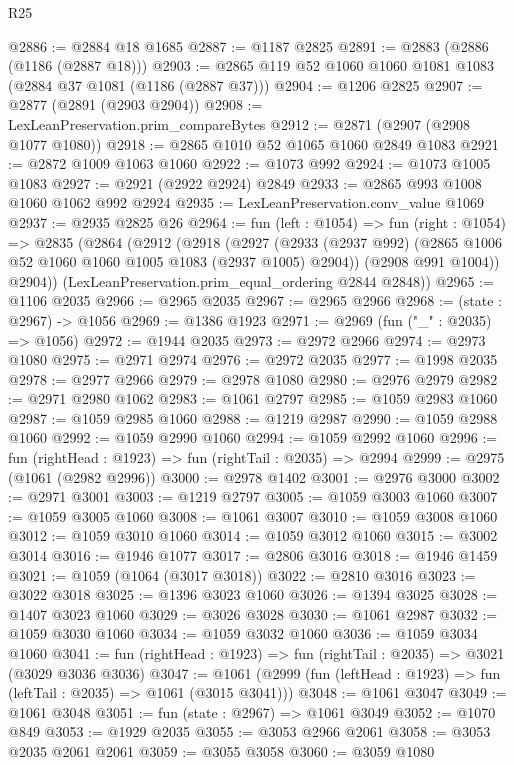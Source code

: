 \begin{lexlean}{R25}
\begin{coremodule}
@2886 := @2884 @18 @1685
@2887 := @1187 @2825
@2891 := @2883 (@2886 (@1186 (@2887 @18)))
@2903 := @2865 @119 @52 @1060 @1060 @1081 @1083 (@2884 @37 @1081 (@1186 (@2887 @37)))
@2904 := @1206 @2825
@2907 := @2877 (@2891 (@2903 @2904))
@2908 := LexLeanPreservation.prim_compareBytes
@2912 := @2871 (@2907 (@2908 @1077 @1080))
@2918 := @2865 @1010 @52 @1065 @1060 @2849 @1083
@2921 := @2872 @1009 @1063 @1060
@2922 := @1073 @992
@2924 := @1073 @1005 @1083
@2927 := @2921 (@2922 @2924) @2849
@2933 := @2865 @993 @1008 @1060 @1062 @992 @2924
@2935 := LexLeanPreservation.conv_value @1069
@2937 := @2935 @2825 @26
@2964 := fun (left : @1054) =>
  fun (right : @1054) =>
  @2835
    (@2864
      (@2912
        (@2918
          (@2927
            (@2933 (@2937 @992) (@2865 @1006 @52 @1060 @1060 @1005 @1083 (@2937 @1005) @2904))
            (@2908 @991 @1004))
          @2904))
      (LexLeanPreservation.prim_equal_ordering @2844 @2848))
@2965 := @1106 @2035
@2966 := @2965 @2035
@2967 := @2965 @2966
@2968 := (state : @2967) -> @1056
@2969 := @1386 @1923
@2971 := @2969 (fun ("_" : @2035) => @1056)
@2972 := @1944 @2035
@2973 := @2972 @2966
@2974 := @2973 @1080
@2975 := @2971 @2974
@2976 := @2972 @2035
@2977 := @1998 @2035
@2978 := @2977 @2966
@2979 := @2978 @1080
@2980 := @2976 @2979
@2982 := @2971 @2980 @1062
@2983 := @1061 @2797
@2985 := @1059 @2983 @1060
@2987 := @1059 @2985 @1060
@2988 := @1219 @2987
@2990 := @1059 @2988 @1060
@2992 := @1059 @2990 @1060
@2994 := @1059 @2992 @1060
@2996 := fun (rightHead : @1923) => fun (rightTail : @2035) => @2994
@2999 := @2975 (@1061 (@2982 @2996))
@3000 := @2978 @1402
@3001 := @2976 @3000
@3002 := @2971 @3001
@3003 := @1219 @2797
@3005 := @1059 @3003 @1060
@3007 := @1059 @3005 @1060
@3008 := @1061 @3007
@3010 := @1059 @3008 @1060
@3012 := @1059 @3010 @1060
@3014 := @1059 @3012 @1060
@3015 := @3002 @3014
@3016 := @1946 @1077
@3017 := @2806 @3016
@3018 := @1946 @1459
@3021 := @1059 (@1064 (@3017 @3018))
@3022 := @2810 @3016
@3023 := @3022 @3018
@3025 := @1396 @3023 @1060
@3026 := @1394 @3025
@3028 := @1407 @3023 @1060
@3029 := @3026 @3028
@3030 := @1061 @2987
@3032 := @1059 @3030 @1060
@3034 := @1059 @3032 @1060
@3036 := @1059 @3034 @1060
@3041 := fun (rightHead : @1923) => fun (rightTail : @2035) => @3021 (@3029 @3036 @3036)
@3047 := @1061 (@2999 (fun (leftHead : @1923) => fun (leftTail : @2035) => @1061 (@3015 @3041)))
@3048 := @1061 @3047
@3049 := @1061 @3048
@3051 := fun (state : @2967) => @1061 @3049
@3052 := @1070 @849
@3053 := @1929 @2035
@3055 := @3053 @2966 @2061
@3058 := @3053 @2035 @2061 @2061
@3059 := @3055 @3058
@3060 := @3059 @1080

\end{coremodule}
\end{lexlean}
